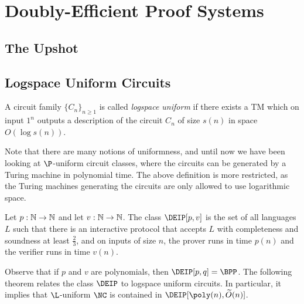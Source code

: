 \newcommand{\F}{\mathbb{F}}
\newcommand{\fH}{\mathbb{H}}

\chapter{Doubly-Efficient Proof Systems}
\label{lec:09}

\section*{The Upshot}%

\section{Logspace Uniform Circuits}

\begin{definition}\label{def:logspaceuniform}
  A circuit family $\{C_n\}_{n \geq 1}$ is called \emph{logspace uniform} if
  there exists a TM which on input $1^n$ outputs a description of the circuit
  $C_n$ of size $s(n)$ in space $O(\log s(n))$.
\end{definition}

Note that there are many notions of uniformness, and until now we have been
looking at $\P$-uniform circuit classes, where the circuits can be generated by
a Turing machine in polynomial time. The above definition is more restricted,
as the Turing machines generating the circuits are only allowed to use
logarithmic space.

\begin{definition}
  Let $p : \mathbb{N} \to \mathbb{N}$ and let $v : \mathbb{N} \to \mathbb{N}$. The class $\DEIP[p, v]$ is the
  set of all languages $L$ such that there is an interactive protocol that
  accepts $L$ with completeness and soundness at least $\frac23$, and on inputs
  of size $n$, the prover runs in time $p(n)$ and the verifier runs in time
  $v(n)$.
\end{definition}

Observe that if $p$ and $v$ are polynomials, then $\DEIP[p, q] = \BPP$. The
following theorem relates the class $\DEIP$ to logspace uniform circuits. In
particular, it implies that $\L$-uniform $\NC$ is contained in $\DEIP[\poly(n),
\widetilde{O}(n)]$.

